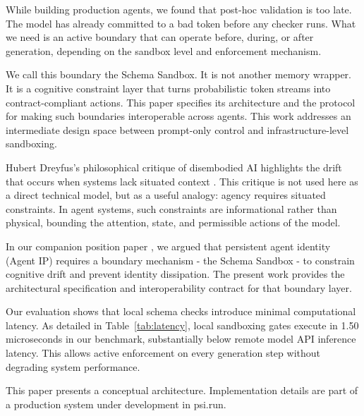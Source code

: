 \documentclass[10pt,journal,compsoc]{IEEEtran}
\begin{document}
While building production agents, we found that post-hoc validation is too late. The model has already committed to a bad token before any checker runs. What we need is an active boundary that can operate before, during, or after generation, depending on the sandbox level and enforcement mechanism.

We call this boundary the Schema Sandbox. It is not another memory wrapper. It is a cognitive constraint layer that turns probabilistic token streams into contract-compliant actions. This paper specifies its architecture and the protocol for making such boundaries interoperable across agents. This work addresses an intermediate design space between prompt-only control and infrastructure-level sandboxing.

Hubert Dreyfus's philosophical critique of disembodied AI highlights the drift that occurs when systems lack situated context \cite{dreyfus1972}. This critique is not used here as a direct technical model, but as a useful analogy: agency requires situated constraints. In agent systems, such constraints are informational rather than physical, bounding the attention, state, and permissible actions of the model.

In our companion position paper \cite{liu2026concretization}, we argued that persistent agent identity (Agent IP) requires a boundary mechanism - the Schema Sandbox - to constrain cognitive drift and prevent identity dissipation. The present work provides the architectural specification and interoperability contract for that boundary layer.

Our evaluation shows that local schema checks introduce minimal computational latency. As detailed in Table~\ref{tab:latency}, local sandboxing gates execute in 1.50 microseconds in our benchmark, substantially below remote model API inference latency. This allows active enforcement on every generation step without degrading system performance.

This paper presents a conceptual architecture. Implementation details are part of a production system under development in psi.run.
\end{document}

